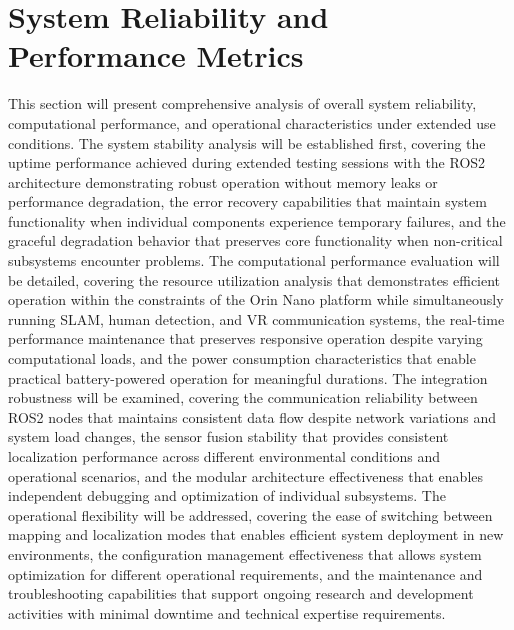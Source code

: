 \section{System Reliability and Performance Metrics}
This section will present comprehensive analysis of overall system reliability, computational performance, and operational characteristics under extended use conditions. The system stability analysis will be established first, covering the uptime performance achieved during extended testing sessions with the ROS2 architecture demonstrating robust operation without memory leaks or performance degradation, the error recovery capabilities that maintain system functionality when individual components experience temporary failures, and the graceful degradation behavior that preserves core functionality when non-critical subsystems encounter problems. The computational performance evaluation will be detailed, covering the resource utilization analysis that demonstrates efficient operation within the constraints of the Orin Nano platform while simultaneously running SLAM, human detection, and VR communication systems, the real-time performance maintenance that preserves responsive operation despite varying computational loads, and the power consumption characteristics that enable practical battery-powered operation for meaningful durations. The integration robustness will be examined, covering the communication reliability between ROS2 nodes that maintains consistent data flow despite network variations and system load changes, the sensor fusion stability that provides consistent localization performance across different environmental conditions and operational scenarios, and the modular architecture effectiveness that enables independent debugging and optimization of individual subsystems. The operational flexibility will be addressed, covering the ease of switching between mapping and localization modes that enables efficient system deployment in new environments, the configuration management effectiveness that allows system optimization for different operational requirements, and the maintenance and troubleshooting capabilities that support ongoing research and development activities with minimal downtime and technical expertise requirements.

